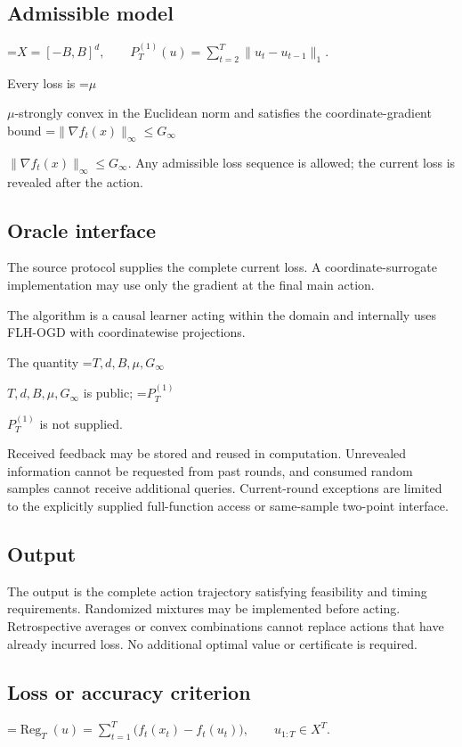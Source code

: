 \documentclass[10pt,a4paper]{article}
\newcommand{\AtlasMath}[1]{\par\begingroup\centering\setbox0=\hbox{$\displaystyle #1$}\ifdim\wd0>1.4\linewidth\typeout{ATLAS WIDE FORMULA: \the\wd0}\fi\ifdim\wd0>\linewidth\resizebox{\linewidth}{!}{\box0}\else\box0\fi\par\endgroup}
\newcommand{\AtlasInlineMath}[1]{\begingroup\setbox0=\hbox{$#1$}\ifdim\wd0>.4\linewidth\endgroup\AtlasMath{#1}\else\endgroup$#1$\fi}
\begin{document}
\subsection{Admissible model}

\AtlasMath{X=[-B,B]^d,\qquad P_T^{(1)}(u)=\sum_{t=2}^{T}\|u_t-u_{t-1}\|_1.}


Every loss is \AtlasInlineMath{\mu}-strongly convex in the Euclidean norm and satisfies the coordinate-gradient bound \AtlasInlineMath{\|\nabla f_t(x)\|_\infty\le G_\infty}. Any admissible loss sequence is allowed; the current loss is revealed after the action.

\subsection{Oracle interface}
The source protocol supplies the complete current loss. A coordinate-surrogate implementation may use only the gradient at the final main action.

The algorithm is a causal learner acting within the domain and internally uses FLH-OGD with coordinatewise projections.

The quantity \AtlasInlineMath{T,d,B,\mu,G_\infty} is public; \AtlasInlineMath{P_T^{(1)}} is not supplied.

Received feedback may be stored and reused in computation. Unrevealed information cannot be requested from past rounds, and consumed random samples cannot receive additional queries. Current-round exceptions are limited to the explicitly supplied full-function access or same-sample two-point interface.

\subsection{Output}
The output is the complete action trajectory satisfying feasibility and timing requirements. Randomized mixtures may be implemented before acting. Retrospective averages or convex combinations cannot replace actions that have already incurred loss. No additional optimal value or certificate is required.

\subsection{Loss or accuracy criterion}

\AtlasMath{\operatorname{Reg}_T(u)=\sum_{t=1}^{T}\bigl(f_t(x_t)-f_t(u_t)\bigr),\qquad u_{1:T}\in X^T.}
\end{document}
